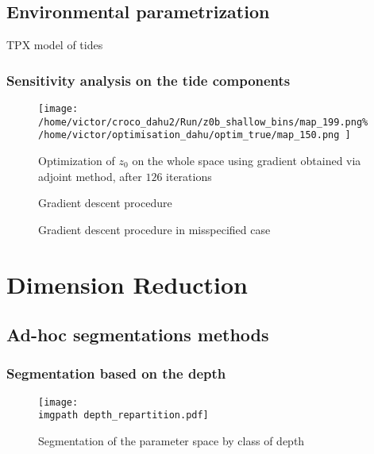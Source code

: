 \documentclass[../../Main_ManuscritThese.tex]{subfiles}
\newcommand\imgpath{/home/victor/acadwriting/Manuscrit/Text/Chapter5/img/}
\begin{document}
\subsection{Environmental parametrization}
\label{sec:environmental_param}
\cite{egbert_efficient_2002} TPX model of tides

\subsubsection{Sensitivity analysis on the tide components}




 \begin{figure}[ht]
  \centering
  \texttt{[image: /home/victor/croco\_dahu2/Run/z0b\_shallow\_bins/map\_199.png\% /home/victor/optimisation\_dahu/optim\_true/map\_150.png
  ]}
  \caption{\label{fig:optimization_map_126} Optimization of $z_0$ on the whole space using gradient obtained via adjoint method, after $126$ iterations}
\end{figure}

 \begin{figure}[ht]
  \centering
  
  \caption{\label{fig:ctrl_true} Gradient descent procedure}
\end{figure}

 \begin{figure}[ht]
  \centering
  
  \caption{\label{fig:ctrl_0_001} Gradient descent procedure in misspecified case}
\end{figure}


\section{Dimension Reduction}

\subsection{Ad-hoc segmentations methods}

\subsubsection{Segmentation based on the depth}

\cite{boutet_estimation_2015}
\begin{figure}[ht]
  \centering
  \texttt{[image: \\imgpath depth\_repartition.pdf]}
  \caption{\label{fig:depth_repartition} Segmentation of the parameter space by class of depth}
\end{figure}
\end{document}
